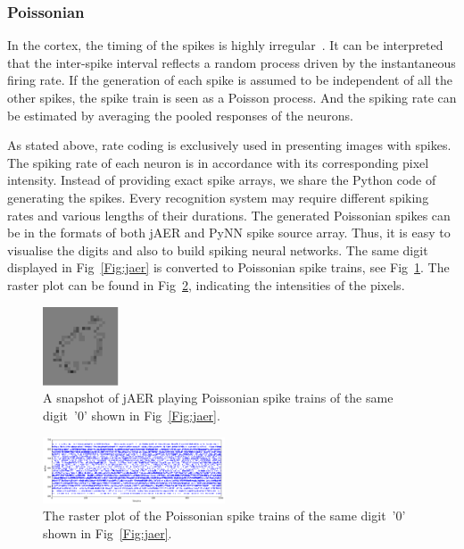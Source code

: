 	\subsubsection{Poissonian}
	
	In the cortex, the timing of the spikes is highly irregular~\cite{squire1998findings}.
	It can be interpreted that the inter-spike interval reflects a random process driven by the instantaneous firing rate.
	If the generation of each spike is assumed to be independent of all the other spikes, the spike train is seen as a Poisson process.
	And the spiking rate can be estimated by averaging the pooled responses of the neurons.
		
	As stated above, rate coding is exclusively used in presenting images with spikes.
	The spiking rate of each neuron is in accordance with its corresponding pixel intensity.
	Instead of providing exact spike arrays, we share the Python code of generating the spikes.
	Every recognition system may require different spiking rates and various lengths of their durations.
	The generated Poissonian spikes can be in the formats of both jAER and PyNN spike source array.
	Thus, it is easy to visualise the digits and also to build spiking neural networks.
	The same digit displayed in Fig~\ref{Fig:jaer} is converted to Poissonian spike trains, see Fig~\ref{Fig:poisson}.
	The raster plot can be found in Fig~\ref{Fig:raster}, indicating the intensities of the pixels.
	
	\begin{figure}[hbt!]
		\centering
		\includegraphics[width=0.2\textwidth]{images/zero-28.pdf}
		\caption{A snapshot of jAER playing Poissonian spike trains of the same digit~'0' shown in Fig~\ref{Fig:jaer}.}
		\label{Fig:poisson}
	\end{figure}  
	
	\begin{figure}[hbt!]
		\centering
		\includegraphics[width=0.48\textwidth]{images/zero.png}
		\caption{The raster plot of the Poissonian spike trains of the same digit~'0' shown in Fig~\ref{Fig:jaer}.}
		\label{Fig:raster}
	\end{figure}  
	

